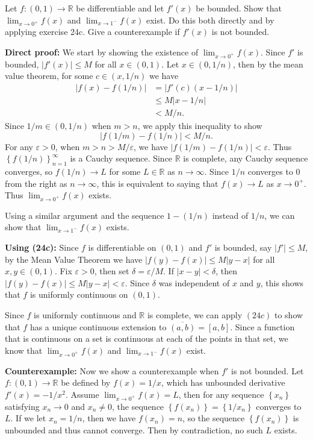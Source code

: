 \documentclass[10pt]{amsart}
\newenvironment{exercise}[1]{%
        \vspace{10mm}
        \renewcommand\themanualtheoreminner{#1}%
  \manualtheoreminner
}\hrulefill{\endmanualtheoreminner}
\begin{document}
\begin{exercise}{25}
	Let $f:(0,1)\to\mathbb{R}$ be differentiable and let $f'(x)$ be bounded. Show that $\lim_{x \to 0^{+}} f(x)$ and $\lim_{x \to 1^{-}} f(x)$ exist. Do this both directly and by applying exercise 24c. Give a counterexample if $f'(x)$ is not bounded.
\end{exercise}

\textbf{Direct proof:} We start by showing the existence of $\lim_{x \to 0^+} f(x)$. Since $f'$ is bounded, $|f'(x)| \leq M$ for all $x \in (0,1)$. Let $x \in (0, 1/n)$, then by the mean value theorem, for some $c \in (x,1/n)$ we have
\begin{align*}
	|f(x) - f(1/n)| &= |f'(c) (x-1/n)| \\
			&\leq M |x-1/n| \\
			&< M/n.
\end{align*}
Since $1/m \in (0, 1/n)$ when $m>n$, we apply this inequality to show \[|f(1/m) - f(1/n)| < M/n.\] For any $\varepsilon>0$, when $m>n>M/\varepsilon$, we have $|f(1/m) - f(1/n)|<\varepsilon$. Thus $\left\{ f(1/n) \right\}_{n=1}^{\infty}$ is a Cauchy sequence. Since $\mathbb{R}$ is complete, any Cauchy sequence converges, so $f(1/n) \to L$ for some $L \in \mathbb{R}$ as $n \to \infty$. Since $1/n$ converges to $0$ from the right as $n \to \infty$, this is equivalent to saying that $f(x) \to L$ as $x \to 0^+$. Thus $\lim_{x \to 0^+} f(x)$ exists.

Using a similar argument and the sequence $1-(1/n)$ instead of $1/n$, we can show that $\lim_{x \to 1^-} f(x)$ exists.

\textbf{Using (24c):} Since $f$ is differentiable on $(0,1)$ and $f'$ is bounded, say $|f'| \leq M$, by the Mean Value Theorem we have $|f(y)-f(x)| \leq M |y-x|$ for all $x,y \in (0,1)$. Fix $\varepsilon>0$, then set $\delta=\varepsilon/M$. If $|x-y| < \delta$, then $|f(y)-f(x)| \leq M |y-x| < \varepsilon$. Since $\delta$ was independent of $x$ and $y$, this shows that $f$ is uniformly continuous on $(0,1)$.

Since $f$ is uniformly continuous and $\mathbb{R}$ is complete, we can apply $(24c)$ to show that $f$ has a unique continuous extension to $\overline{(a,b)} =[a,b]$. Since a function that is continuous on a set is continuous at each of the points in that set, we know that $\lim_{x \to 0^+} f(x)$ and $\lim_{x \to 1^-} f(x)$ exist.

\textbf{Counterexample:} Now we show a counterexample when $f'$ is not bounded. Let $f:(0,1) \to \mathbb{R}$ be defined by $f(x) = 1/x$, which has unbounded derivative $f'(x) = -1/x^{2}$. Assume $\lim_{x \to 0^+} f(x) = L$, then for any sequence $\left\{ x_n \right\}$ satisfying $x_n \to 0$ and $x_n \neq 0$, the sequence $\left\{f(x_n)\right\} = \left\{ 1/x_n \right\}$ converges to $L$. If we let $x_n = 1/n$, then we have $f(x_n) = n$, so the sequence $\left\{ f(x_n) \right\}$ is unbounded and thus cannot converge. Then by contradiction, no such $L$ exists.
\end{document}
